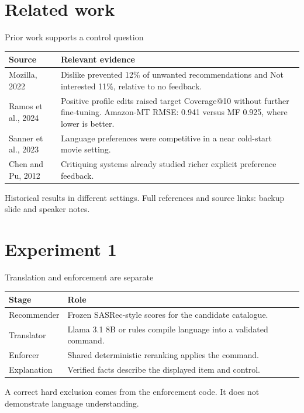 \documentclass[10pt]{beamer}
\newcommand{\toprule}{\hline}
\newcommand{\midrule}{\hline}
\newcommand{\bottomrule}{\hline}
\newcommand{\src}[1]{\vfill{\tiny\color{bcitgray}#1}}
\begin{document}
\section{Related work}
\begin{frame}{Prior work supports a control question}
\small
\begin{tabular}{@{}P{2.1cm}P{8.0cm}@{}}
\toprule
Source & Relevant evidence\\\midrule
Mozilla, 2022 & Dislike prevented 12\% of unwanted recommendations and Not interested 11\%, relative to no feedback.\\[0.15cm]
Ramos et al., 2024 & Positive profile edits raised target Coverage@10 without further fine-tuning. Amazon-MT RMSE: 0.941 versus MF 0.925, where lower is better.\\[0.15cm]
Sanner et al., 2023 & Language preferences were competitive in a near cold-start movie setting.\\[0.15cm]
Chen and Pu, 2012 & Critiquing systems already studied richer explicit preference feedback.\\\bottomrule
\end{tabular}\par
\src{Historical results in different settings. Full references and source links: backup slide and speaker notes.}
\end{frame}

\section{Experiment 1}
\begin{frame}{Translation and enforcement are separate}
\begin{tabular}{@{}P{2.2cm}P{7.9cm}@{}}
\toprule
Stage & Role\\\midrule
Recommender & Frozen SASRec-style scores for the candidate catalogue.\\[0.18cm]
Translator & Llama 3.1 8B or rules compile language into a validated command.\\[0.18cm]
Enforcer & Shared deterministic reranking applies the command.\\[0.18cm]
Explanation & Verified facts describe the displayed item and control.\\\bottomrule
\end{tabular}\par
\vspace{0.35cm}
A correct hard exclusion comes from the enforcement code. It does not demonstrate language understanding.
\end{frame}
\end{document}
